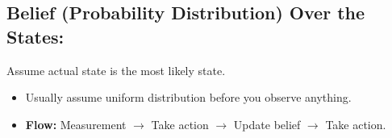 \subsection{Belief (Probability Distribution) Over the States:}
\begin{notes} Assume actual state is the most likely state. 
    \begin{itemize}
        \item Usually assume uniform distribution before you observe anything. 
        \item \textbf{Flow:} Measurement $\rightarrow$ Take action $\rightarrow$ Update belief $\rightarrow$ Take action. 
    \end{itemize}
\end{notes}
\newpage

